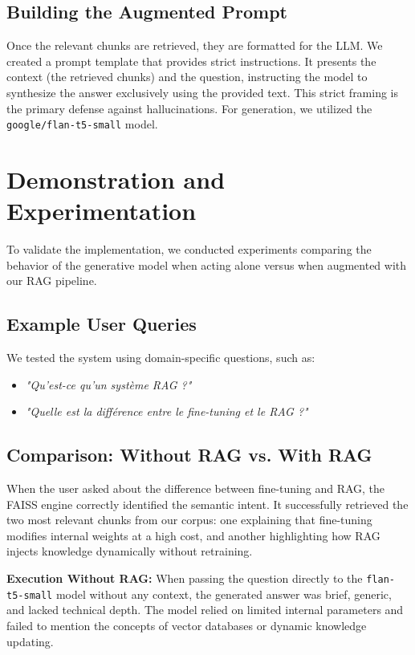 \documentclass[11pt,a4paper]{article}
\begin{document}
\subsection{Building the Augmented Prompt}
Once the relevant chunks are retrieved, they are formatted for the LLM. We created a prompt template that provides strict instructions. It presents the context (the retrieved chunks) and the question, instructing the model to synthesize the answer exclusively using the provided text. This strict framing is the primary defense against hallucinations. For generation, we utilized the \texttt{google/flan-t5-small} model.

\section{Demonstration and Experimentation}

To validate the implementation, we conducted experiments comparing the behavior of the generative model when acting alone versus when augmented with our RAG pipeline.

\subsection{Example User Queries}
We tested the system using domain-specific questions, such as:
\begin{itemize}
    \item \textit{"Qu'est-ce qu'un système RAG ?"}
    \item \textit{"Quelle est la différence entre le fine-tuning et le RAG ?"}
\end{itemize}

\subsection{Comparison: Without RAG vs. With RAG}

When the user asked about the difference between fine-tuning and RAG, the FAISS engine correctly identified the semantic intent. It successfully retrieved the two most relevant chunks from our corpus: one explaining that fine-tuning modifies internal weights at a high cost, and another highlighting how RAG injects knowledge dynamically without retraining.

\textbf{Execution Without RAG:} 
When passing the question directly to the \texttt{flan-t5-small} model without any context, the generated answer was brief, generic, and lacked technical depth. The model relied on limited internal parameters and failed to mention the concepts of vector databases or dynamic knowledge updating.
\end{document}
